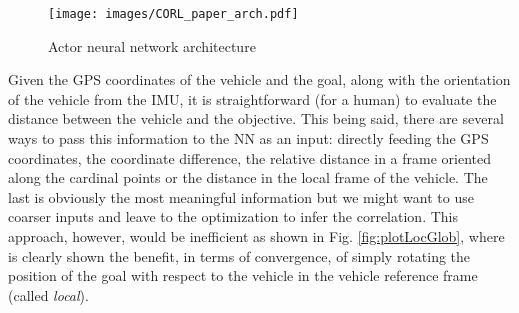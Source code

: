 \begin{figure}[h]
    \centering
    \texttt{[image: images/CORL\_paper\_arch.pdf]}
    \caption{Actor neural network architecture}
    \label{fig:NN_arch}
\end{figure}




Given the GPS coordinates of the vehicle and the goal, along with the orientation of the vehicle from the IMU, it is straightforward (for a human) to evaluate the distance between the vehicle and the objective. This being said, there are several ways to pass this information to the NN as an input: directly feeding the GPS coordinates, the coordinate difference, the relative distance in a frame oriented along the cardinal points or the distance in the local frame of the vehicle. The last is obviously the most meaningful information but we might want to use coarser inputs and leave to the optimization to infer the correlation. This approach, however, would be inefficient as shown in Fig. \ref{fig:plotLocGlob}, where is clearly shown the benefit, in terms of convergence, of simply rotating the position of the goal with respect to the vehicle in the vehicle reference frame (called \emph{local}).


